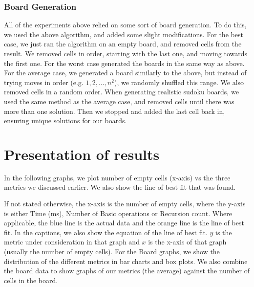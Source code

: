 \documentclass[16pt]{article}
\begin{document}
\subsubsection{Board Generation}
All of the experiments above relied on some sort of board generation. To do this, we used the above algorithm, and added some slight modifications.
\newline
\newline
For the best case, we just ran the algorithm on an empty board, and removed cells from the result. We removed cells in order, starting with the last one, and moving towards the first one.
\newline
\newline
For the worst case generated the boards in the same way as above.
\newline
\newline
For the average case, we generated a board similarly to the above, but instead of trying moves in order (e.g. $1,2,\dots, n^2$), we randomly shuffled this range. We also removed cells in a random order.
\newline
\newline
When generating realistic sudoku boards, we used the same method as the average case, and removed cells until there was more than one solution. Then we stopped and added the last cell back in, ensuring unique solutions for our boards.


\section{Presentation of results}
In the following graphs, we plot number of empty cells (x-axis) vs the three metrics we discussed earlier.
We also show the line of best fit that was found. 

If not stated otherwise, the x-axis is the number of empty cells, where the y-axis is either Time (ms), Number of Basic operations or Recursion count.
Where applicable, the blue line is the actual data and the orange line is the line of best fit.
\newline
In the captions, we also show the equation of the line of best fit.
$y$ is the metric under consideration in that graph and $x$ is the x-axis of that graph (usually the number of empty cells).
\newline
\newline
For the Board graphs, we show the distribution of the different metrics in bar charts and box plots.
\newline
We also combine the board data to show graphs of our metrics (the average) against the number of cells in the board.
\end{document}
